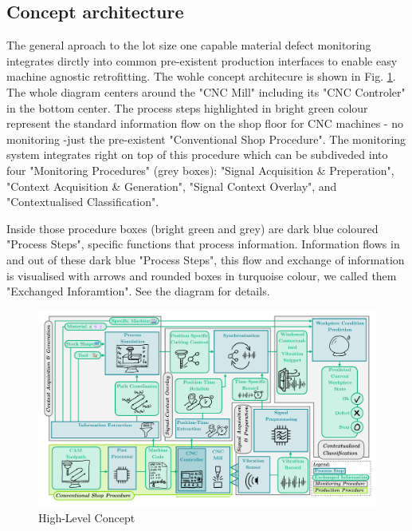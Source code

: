 \documentclass[5p,times,procedia]{elsarticle}
\begin{document}
\subsection{Concept architecture}
\vspace*{-\baselineskip}
The general aproach to the lot size one capable material defect monitoring integrates dirctly into common pre-existent production interfaces to enable easy machine agnostic retrofitting. The wohle concept architecure is shown in Fig. \ref{Fig_ConceptDiagram}.
The whole diagram centers around the "CNC Mill" including its "CNC Controler" in the bottom center. The process steps highlighted in bright green colour represent the standard information flow on the shop floor for CNC machines - no monitoring -just the pre-existent "Conventional Shop Procedure".
The monitoring system integrates right on top of this procedure which can be subdiveded into four "Monitoring Procedures" (grey boxes): "Signal Acquisition \& Preperation", "Context Acquisition \& Generation", "Signal Context Overlay", and "Contextualised Classification".

Inside those procedure boxes (bright green and grey) are dark blue coloured "Process Steps", specific functions that process information. Information flows in and out of these dark blue "Process Steps", this flow and exchange of information is visualised with arrows and rounded boxes in turquoise colour, we called them "Exchanged Inforamtion".
See the diagram for details.

\begin{figure}[t]
    \centering
    \includegraphics[width=0.99\linewidth]{ConceptDiagram.pdf}
    \caption{High-Level Concept}
    \label{Fig_ConceptDiagram}
\end{figure}
 
\end{document}
